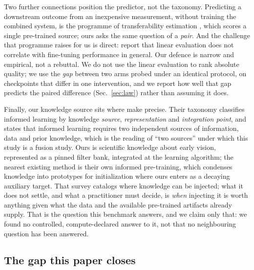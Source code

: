 Two further connections position the predictor, not the taxonomy. Predicting a
downstream outcome from an inexpensive measurement, without training the
combined system, is the programme of transferability estimation
\citep{nguyen2020leep}, which scores a single pre-trained source; ours asks the
same question of a \emph{pair}. And the challenge that programme raises for us
is direct: \citet{newell2020useful} report that linear evaluation does not
correlate with fine-tuning performance in general. Our defence is narrow and
empirical, not a rebuttal. We do not use the linear evaluation to rank absolute
quality; we use the \emph{gap} between two arms probed under an identical
protocol, on checkpoints that differ in one intervention, and we report how
well that gap predicts the paired difference (Sec.~\ref{sec:law}) rather
than assuming it does.

Finally, our knowledge source sits where \citet{vonrueden2023informed} make
precise. Their taxonomy classifies informed learning by knowledge
\emph{source}, \emph{representation} and \emph{integration point}, and states
that informed learning requires two independent sources of information, data
and prior knowledge, which is the reading of ``two sources'' under which this
study is a fusion study. Ours is scientific knowledge about early vision,
represented as a pinned filter bank, integrated at the learning algorithm; the
nearest existing method is their own informed pre-training, which condenses
knowledge into prototypes for initialization where ours enters as a decaying
auxiliary target. That survey catalogs where knowledge can be injected; what it
does not settle, and what a practitioner must decide, is \emph{when} injecting
it is worth anything given what the data and the available pre-trained
artifacts already supply. That is the question this benchmark answers, and we
claim only that: we found no controlled,
compute-declared answer to it, not that no neighbouring question has been
answered.

\subsection{The gap this paper closes}\label{sec:gap}


